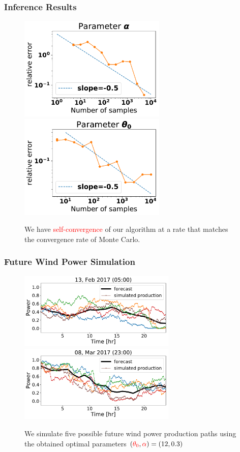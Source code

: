 \documentclass[aspectratio=169]{beamer}\usepackage[utf8]{inputenc}
\begin{document}
\begin{frame}\frametitle{Inference Results}
\begin{figure}
  \includegraphics[width=70mm,scale=1]{plots/alpha_conv_beta.pdf}
  \includegraphics[width=70mm,scale=1]{plots/theta_conv_beta.pdf}
  \caption{We have \textcolor{red}{self-convergence} of our algorithm at a rate that matches the convergence rate of Monte Carlo.}
\end{figure}
\end{frame}

\begin{frame}\frametitle{Future Wind Power Simulation}
    \begin{figure}
      \includegraphics[width=75mm,scale=1]{simulated/24hr/1099.pdf}
      \includegraphics[width=75mm,scale=1]{simulated/24hr/1178.pdf}
      \caption{We simulate five possible future wind power production paths using the obtained optimal parameters $(\textcolor{red}{\theta_0}, \textcolor{red}{\alpha} )=(12,0.3)$ }
    \end{figure}
\end{frame}
\end{document}
